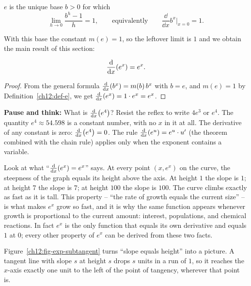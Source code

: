 \begin{definition}
\label{ch12:def-e}
$e$ is the unique base $b>0$ for which
\[
   \lim_{h\to 0}\frac{b^h-1}{h} = 1,
   \qquad\text{equivalently}\qquad
   \frac{\dd}{\dd x}b^x\Big|_{x=0} = 1.
\]
\end{definition}

With this base the constant $m(e)=1$, so the leftover limit is $1$ and
we obtain the main result of this section:

\begin{theorem}
\label{ch12:thm-ex}
\[
   \frac{\mathrm{d}}{\mathrm{d} x}\!\left(e^x\right) = e^x.
\]
\end{theorem}

\begin{proof}
From the general formula $\frac{\mathrm{d}}{\mathrm{d} x}\!\left(b^x\right)=m(b)\,b^x$ with $b=e$, and
$m(e)=1$ by Definition~\ref{ch12:def-e}, we get $\frac{\mathrm{d}}{\mathrm{d} x}\!\left(e^x\right)=1\cdot e^x = e^x$.
\end{proof}

\begin{recoverybox}
\textbf{Pause and think:} What is $\frac{\mathrm{d}}{\mathrm{d} x}\!\left(e^4\right)$?
Resist the reflex to write $4e^3$ or $e^4$. The quantity $e^4 \approx 54.598$
is a constant number, with no $x$ in it at all. The derivative of any constant
is zero: $\frac{\mathrm{d}}{\mathrm{d} x}\!\left(e^4\right) = 0$. The rule $\frac{\mathrm{d}}{\mathrm{d} x}\!\left(e^u\right) = e^u \cdot u'$ (the theorem
combined with the chain rule) applies only when the exponent contains a variable.
\end{recoverybox}

\begin{happeningbox}
Look at what ``$\frac{\mathrm{d}}{\mathrm{d} x}\!\left(e^x\right)=e^x$'' says. At every point $(x, e^x)$
on the curve, the steepness of the graph equals its height above the axis.
At height $1$ the slope is $1$; at height $7$ the slope is $7$; at height
$100$ the slope is $100$. The curve climbs exactly as fast as it
is tall. This property -- ``the rate of growth equals the current
size'' -- is what makes $e^x$ grow so fast, and it is why the same function
appears whenever growth is proportional to the current amount: interest,
populations, and chemical reactions. In fact $e^x$ is the only function that
equals its own derivative and equals $1$ at $0$; every other property of
$e^x$ can be derived from these two facts.

Figure~\ref{ch12:fig-exp-subtangent} turns ``slope equals height'' into a
picture. A tangent line with slope $s$ at height $s$ drops $s$ units in a run of
$1$, so it reaches the $x$-axis exactly one unit to the left of the point of
tangency, wherever that point is.
\end{happeningbox}

